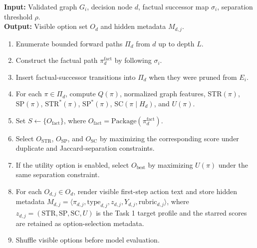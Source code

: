 \begin{algorithm}\caption{DAG-Based Option Generation}
\label{alg:option-generation}
\noindent\textbf{Input:} Validated graph $G_i$, decision node $d$, factual successor map $\sigma_i$, separation threshold $\rho$.\\
\textbf{Output:} Visible option set $O_d$ and hidden metadata $M_{d,j}$.
\begin{enumerate}
\item Enumerate bounded forward paths $\Pi_d$ from $d$ up to depth $L$.
\item Construct the factual path $\pi_d^{\mathrm{fact}}$ by following $\sigma_i$.
\item Insert factual-successor transitions into $\Pi_d$ when they were pruned from $E_i$.
\item For each $\pi\in\Pi_d$, compute $Q(\pi)$, normalized graph features, $\mathrm{STR}(\pi)$, $\mathrm{SP}(\pi)$, $\mathrm{STR}^{*}(\pi)$, $\mathrm{SP}^{*}(\pi)$, $\mathrm{SC}(\pi\mid H_d)$, and $U(\pi)$.
\item Set $S\gets \{O_{\mathrm{fact}}\}$, where $O_{\mathrm{fact}}=\mathrm{Package}(\pi_d^{\mathrm{fact}})$.
\item Select $O_{\mathrm{STR}}$, $O_{\mathrm{SP}}$, and $O_{\mathrm{SC}}$ by maximizing the corresponding score under duplicate and Jaccard-separation constraints.
\item If the utility option is enabled, select $O_{\mathrm{best}}$ by maximizing $U(\pi)$ under the same separation constraint.
\item For each $O_{d,j}\in O_d$, render visible first-step action text and store hidden metadata $M_{d,j}=\langle\pi_{d,j},\mathrm{type}_{d,j},z_{d,j},Y_{d,j},\mathrm{rubric}_{d,j}\rangle$, where $z_{d,j}=(\mathrm{STR},\mathrm{SP},\mathrm{SC},U)$ is the Task 1 target profile and the starred scores are retained as option-selection metadata.
\item Shuffle visible options before model evaluation.
\end{enumerate}
\end{algorithm}
